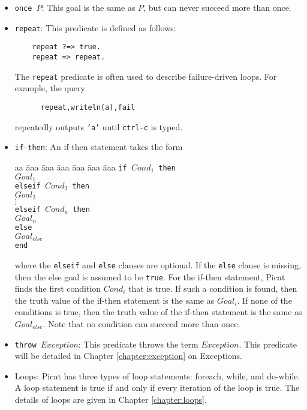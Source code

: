 \begin{itemize}
\item \texttt{once $P$}: This goal is the same as $P$, but can never succeed more than once.
\item \texttt{repeat}: This predicate is defined as follows:
\begin{verbatim}
    repeat ?=> true.
    repeat => repeat.
\end{verbatim}
The \texttt{repeat} predicate is often used to describe failure-driven loops. For example, the query 
\begin{verbatim}
      repeat,writeln(a),fail
\end{verbatim} 
repeatedly outputs \texttt{'a'} until \texttt{ctrl-c} is typed.
\item \texttt{if-then}: An if-then statement takes the form 
\begin{tabbing}
aa \= aaa \= aaa \= aaa \= aaa \= aaa \= aaa \kill
\> \texttt{if $Cond_1$ then} \\
\> \> $Goal_1$ \\
\> \texttt{elseif $Cond_2$ then} \\
\> \> $Goal_2$ \\
\> \> $\vdots$ \\
\> \texttt{elseif $Cond_{n}$ then} \\
\> \> $Goal_{n}$ \\
\> \texttt{else} \\
\> \> $Goal_{else}$ \\
\> \texttt{end}
\end{tabbing}
where the \texttt{elseif} and \texttt{else} clauses are optional. If the \texttt{else} clause is missing, then the else goal is assumed to be \texttt{true}. For the if-then statement, Picat finds the first condition $Cond_i$ that is true. If such a condition is found, then the truth value of the if-then statement is the same as $Goal_i$. If none of the conditions is true, then the truth value of the if-then statement is the same as $Goal_{else}$. Note that no condition can succeed more than once. 
\item \texttt{throw $Exception$}: This predicate throws the term $Exception$. This predicate will be detailed in Chapter \ref{chapter:exception} on Exceptions.
\item Loops: Picat has three types of loop statements: foreach, while, and do-while.  A loop statement is true if and only if every iteration of the loop is true. The details of loops are given in Chapter \ref{chapter:loops}.
\end{itemize}

